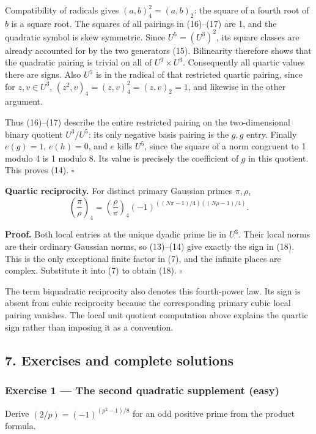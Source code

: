 \documentclass[11pt,a4paper]{article}
\begin{document}
Compatibility of radicals gives \((a,b)_4^2=(a,b)_2\): the square of a
fourth root of \(b\) is a square root. The squares of all pairings in
(16)--(17) are 1, and the quadratic symbol is skew symmetric. Since
\(U^5=(U^3)^2\), its square classes are already accounted for by the two
generators (15). Bilinearity therefore shows that the quadratic pairing
is trivial on all of \(U^3\times U^3\). Consequently all quartic values
there are signs. Also \(U^5\) is in the radical of that restricted
quartic pairing, since for \(z,v\in U^3\),
\((z^2,v)_4=(z,v)_4^2=(z,v)_2=1\), and likewise in the other argument.

Thus (16)--(17) describe the entire restricted pairing on the
two-dimensional binary quotient \(U^3/U^5\): its only negative basis
pairing is the \(g,g\) entry. Finally \(e(g)=1\), \(e(h)=0\), and \(e\)
kills \(U^5\), since the square of a norm congruent to 1 modulo 4 is 1
modulo 8. Its value is precisely the coefficient of \(g\) in this
quotient. This proves (14). \(\square\)

\textbf{Quartic reciprocity.} For distinct primary Gaussian primes
\(\pi,\rho\), \[
\left(\frac\pi\rho\right)_4
=\left(\frac\rho\pi\right)_4
(-1)^{((N\pi-1)/4)((N\rho-1)/4)}.
\tag{18}
\]

\textbf{Proof.} Both local entries at the unique dyadic prime lie in
\(U^3\). Their local norms are their ordinary Gaussian norms, so
(13)--(14) give exactly the sign in (18). This is the only exceptional
finite factor in (7), and the infinite places are complex. Substitute it
into (7) to obtain (18). \(\square\)

The term biquadratic reciprocity also denotes this fourth-power law. Its
sign is absent from cubic reciprocity because the corresponding primary
cubic local pairing vanishes. The local unit quotient computation above
explains the quartic sign rather than imposing it as a convention.

\subsection{7. Exercises and complete
solutions}\label{exercises-and-complete-solutions}

\subsubsection{Exercise 1 --- The second quadratic supplement
(easy)}\label{exercise-1-the-second-quadratic-supplement-easy}

Derive \((2/p)=(-1)^{(p^2-1)/8}\) for an odd positive prime from the
product formula.
\end{document}
